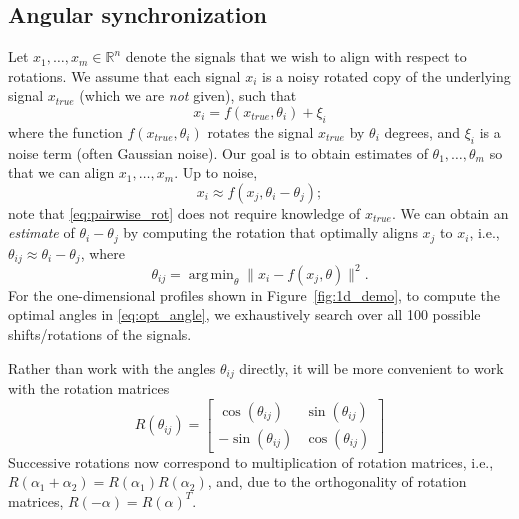 \documentclass{pnastwo}
\DeclareMathOperator*{\argmin}{arg\,min}
\begin{document}
\begin{article}


\begin{materials}

\section{Angular synchronization}

Let $x_1, \dots, x_m \in \mathbb{R}^n$ denote the signals that we wish to align with respect to rotations.
%
We assume that each signal $x_i$ is a noisy rotated copy of the underlying signal $x_{true}$ (which we are {\em not} given), such that 
\begin{equation}
x_i = f(x_{true}, \theta_i) + \xi_i
\end{equation}
where the function $f(x_{true}, \theta_i)$ rotates the signal $x_{true}$ by $\theta_i$ degrees, and $\xi_i$ is a noise term (often Gaussian noise). 
%
Our goal is to obtain estimates of $\theta_1, \dots, \theta_m$ so that we can align $x_1, \dots, x_m$. 
%
Up to noise, 
\begin{equation} \label{eq:pairwise_rot}
x_i \approx f(x_j, \theta_i - \theta_j) ;
\end{equation}
 note that \eqref{eq:pairwise_rot} does not require knowledge of $x_{true}$.
%
We can obtain an {\em estimate} of $\theta_i - \theta_j$ by computing the rotation that optimally aligns $x_j$ to $x_i$, 
i.e., $\theta_{ij} \approx \theta_i - \theta_j$, where
%
\begin{equation} \label{eq:opt_angle}
\theta_{ij} = \argmin_{\theta} \|x_i - f(x_j, \theta)\|^2.
\end{equation}
%
For the one-dimensional profiles shown in Figure~\ref{fig:1d_demo}, to compute the optimal angles in \eqref{eq:opt_angle}, we exhaustively search over all 100 possible shifts/rotations of the signals. 

Rather than work with the angles $\theta_{ij}$ directly, it will be more convenient to work with the rotation matrices 
\begin{equation} \label{eq:R_theta}
R(\theta_{ij}) = \begin{bmatrix}
\cos(\theta_{ij}) & \sin(\theta_{ij}) \\
-\sin(\theta_{ij}) & \cos(\theta_{ij})
\end{bmatrix}
\end{equation}
%
Successive rotations now correspond to multiplication of rotation matrices, i.e., 
$R(\alpha_1 + \alpha_2) = R(\alpha_1) R(\alpha_2)$,
and, due to the orthogonality of rotation matrices, $R(-\alpha) = R(\alpha)^T$.


\end{materials}
\end{article}
\end{document}
